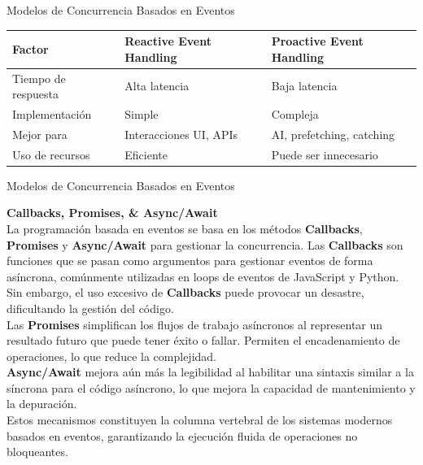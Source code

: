 \documentclass[11pt]{beamer}
\begin{document}
	\begin{frame}{Modelos de Concurrencia Basados en Eventos}
		\small
		\begin{table}
			\centering
			\renewcommand{\arraystretch}{1.2}
			\begin{tabular}{|p{3cm}|p{4cm}|p{4cm}|}
				\hline
				\cellcolor{blue!15}\textbf{Factor} & \cellcolor{blue!15}\textbf{Reactive Event Handling} & \cellcolor{blue!15}\textbf{Proactive Event Handling} \\ \hline
				\cellcolor{blue!15}Tiempo de respuesta & Alta latencia & Baja latencia \\ \hline
				\cellcolor{blue!15}Implementación & Simple & Compleja \\ \hline
				\cellcolor{blue!15}Mejor para & Interacciones UI, APIs & AI, prefetching, catching \\ \hline
				\cellcolor{blue!15}Uso de recursos & Eficiente & Puede ser innecesario \\ \hline
			\end{tabular}
		\end{table}
	\end{frame}
	
	\begin{frame}{Modelos de Concurrencia Basados en Eventos}
		
		\textbf{Callbacks, Promises, \& Async/Await} \\
		\vspace{0.4cm}
		\justifying \small
		La programación basada en eventos se basa en los métodos \textbf{Callbacks}, \textbf{Promises} y \textbf{Async/Await} para gestionar la concurrencia. Las \textbf{Callbacks} son funciones que se pasan como argumentos para gestionar eventos de forma asíncrona, comúnmente utilizadas en loops de eventos de JavaScript y Python. Sin embargo, el uso excesivo de \textbf{Callbacks} puede provocar un desastre, dificultando la gestión del código. \\
		Las \textbf{Promises} simplifican los flujos de trabajo asíncronos al representar un resultado futuro que puede tener éxito o fallar. Permiten el encadenamiento de operaciones, lo que reduce la complejidad. \\
		\textbf{Async/Await} mejora aún más la legibilidad al habilitar una sintaxis similar a la síncrona para el código asíncrono, lo que mejora la capacidad de mantenimiento y la depuración. \\
		Estos mecanismos constituyen la columna vertebral de los sistemas modernos basados en eventos, garantizando la ejecución fluida de operaciones no bloqueantes.
	\end{frame}
	
\end{document}
